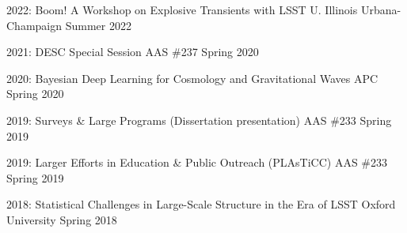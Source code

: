 \documentclass[11pt,letterpaper]{article}
\begin{document}
{}%
\begin{list}{}{\malzlist}
\item 2022: 
	{Boom! A Workshop on Explosive Transients with LSST}
	{U. Illinois Urbana-Champaign}
	{Summer 2022}
\item 2021: 
	{DESC Special Session}%
	{AAS \#237}
	{Spring 2020}
\item 2020: 
	{Bayesian Deep Learning for Cosmology and Gravitational Waves}
	{APC}%
	{Spring 2020}
\item 2019: 
	{Surveys \& Large Programs (Dissertation presentation)}%
	{AAS \#233}
	{Spring 2019}
\item 2019: 
	{Larger Efforts in Education \& Public Outreach (PLAsTiCC)}%
		{AAS \#233}
	{Spring 2019}
\item 2018: 
	{Statistical Challenges in Large-Scale Structure in the Era of LSST}
	{Oxford University}
	{Spring 2018}

\end{list}
\end{document}
